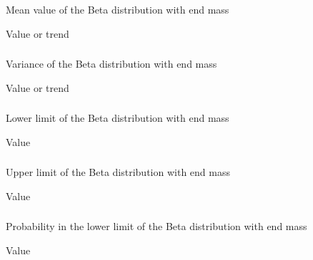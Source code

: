 {\subsubsection{}
 \slist
   \item \Description Mean value of the Beta distribution with end mass
   \item \Argument Value or trend
   \item \Default
 \elist

\subsubsection{}
 \slist
   \item \Description Variance of the Beta distribution with end mass
   \item \Argument Value or trend
   \item \Default
 \elist

\subsubsection{}
 \slist
   \item \Description Lower limit of the Beta distribution with end mass
   \item \Argument Value
   \item {}
 \elist

\subsubsection{}
 \slist
   \item \Description Upper limit of the Beta distribution with end mass
   \item \Argument Value
   \item {}
 \elist

\subsubsection{}
 \slist
   \item \Description Probability in the lower limit of the Beta distribution with end mass
   \item \Argument Value
   \item \Default
 \elist

}
